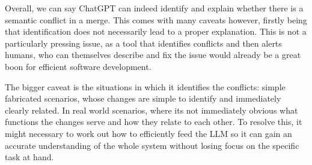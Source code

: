 Overall, we can say ChatGPT can indeed identify and explain whether there is a semantic conflict in a merge. This comes with many caveats however, firstly being that identification does not necessarily lead to a proper explanation. This is not a particularly pressing issue, as a tool that identifies conflicts and then alerts humans, who can themselves describe and fix the issue would already be a great boon for efficient software development.

The bigger caveat is the situations in which it identifies the conflicts: simple fabricated scenarios, whose changes are simple to identify and immediately clearly related. In real world scenarios, where its not immediately obvious what functions the changes serve and how they relate to each other. To resolve this, it might necessary to work out how to efficiently feed the LLM so it can gain an accurate understanding of the whole system without losing focus on the specific task at hand.